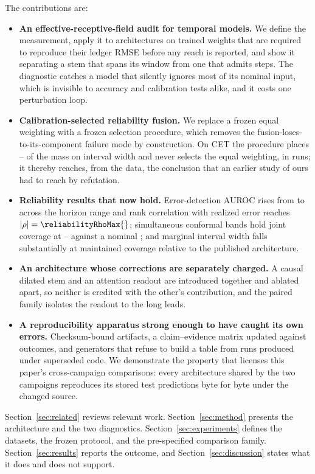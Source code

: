 The contributions are:
\begin{itemize}
    \item \textbf{An effective-receptive-field audit for temporal models.} We define the measurement, apply it to \robustFieldModels{} architectures on trained weights that are required to reproduce their ledger RMSE before any reach is reported, and show it separating a stem that spans its window from one that admits \robustFieldPublished{} steps. The diagnostic catches a model that silently ignores most of its nominal input, which is invisible to accuracy and calibration tests alike, and it costs one perturbation loop.
    \item \textbf{Calibration-selected reliability fusion.} We replace a frozen equal weighting with a frozen selection procedure, which removes the fusion-loses-to-its-component failure mode by construction. On CET the procedure places \fusionWeightLow{}--\fusionWeightHigh{} of the mass on interval width and never selects the equal weighting, in \fusionRuns{} runs; it thereby reaches, from the data, the conclusion that an earlier study of ours had to reach by refutation.
    \item \textbf{Reliability results that now hold.} Error-detection AUROC rises from \errorAurocOne{} to \errorAurocNinety{} across the horizon range and rank correlation with realized error reaches $|\rho|=\reliabilityRhoMax{}$; simultaneous conformal bands hold joint coverage at \simulCoverageThirty{}--\simulCoverageNinety{} against a nominal \nominalCoverage{}; and marginal interval width falls substantially at maintained coverage relative to the published architecture.
    \item \textbf{An architecture whose corrections are separately charged.} A causal dilated stem and an attention readout are introduced together and ablated apart, so neither is credited with the other's contribution, and the paired family isolates the readout to the long leads.
    \item \textbf{A reproducibility apparatus strong enough to have caught its own errors.} Checksum-bound artifacts, a claim--evidence matrix updated against outcomes, and generators that refuse to build a table from runs produced under superseded code. We demonstrate the property that licenses this paper's cross-campaign comparisons: every architecture shared by the two campaigns reproduces its stored test predictions byte for byte under the changed source.
\end{itemize}

Section~\ref{sec:related} reviews relevant work. Section~\ref{sec:method} presents the architecture and the two diagnostics. Section~\ref{sec:experiments} defines the datasets, the frozen protocol, and the pre-specified comparison family. Section~\ref{sec:results} reports the outcome, and Section~\ref{sec:discussion} states what it does and does not support.
